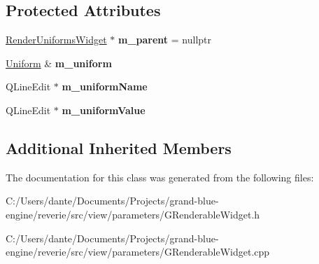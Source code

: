 \subsection*{Protected Attributes}
\begin{DoxyCompactItemize}
\item 
\mbox{\label{classrev_1_1_view_1_1_uniform_widget_a41acc4403cefc757a1953b4913202063}} 
\mbox{\hyperlink{classrev_1_1_view_1_1_render_uniforms_widget}{Render\+Uniforms\+Widget}} $\ast$ {\bfseries m\+\_\+parent} = nullptr
\item 
\mbox{\label{classrev_1_1_view_1_1_uniform_widget_a01f8e422a9140907dda21946d10b37ba}} 
\mbox{\hyperlink{structrev_1_1_uniform}{Uniform}} \& {\bfseries m\+\_\+uniform}
\item 
\mbox{\label{classrev_1_1_view_1_1_uniform_widget_ab6768ebd004bafcfcf14eede6748fa50}} 
Q\+Line\+Edit $\ast$ {\bfseries m\+\_\+uniform\+Name}
\item 
\mbox{\label{classrev_1_1_view_1_1_uniform_widget_aa52c6972fa7e0f39d9e5b1a40c8e3198}} 
Q\+Line\+Edit $\ast$ {\bfseries m\+\_\+uniform\+Value}
\end{DoxyCompactItemize}
\subsection*{Additional Inherited Members}


The documentation for this class was generated from the following files\+:\begin{DoxyCompactItemize}
\item 
C\+:/\+Users/dante/\+Documents/\+Projects/grand-\/blue-\/engine/reverie/src/view/parameters/G\+Renderable\+Widget.\+h\item 
C\+:/\+Users/dante/\+Documents/\+Projects/grand-\/blue-\/engine/reverie/src/view/parameters/G\+Renderable\+Widget.\+cpp\end{DoxyCompactItemize}

